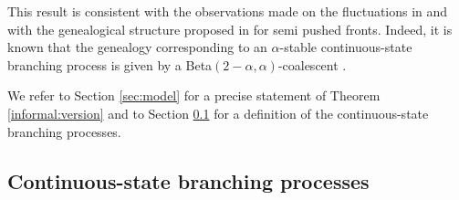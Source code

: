 \documentclass[11pt]{article}
\theoremstyle{plain}
\begin{document}
 This result is consistent with the observations made on the fluctuations in \cite{Birzu2018} and with the genealogical structure proposed in \cite{Birzu:2020up} for semi pushed fronts. Indeed, it is known that the genealogy corresponding to an $\alpha$-stable continuous-state branching process is given by a Beta$(2-\alpha,\alpha)$-coalescent \cite{Birkner2005}.

We refer to Section \ref{sec:model} for a precise statement of Theorem \ref{informal:version} and to Section \ref{sec;csbp} for a definition of the continuous-state branching processes.



\subsection{Continuous-state branching processes}\label{sec;csbp}
\end{document}
